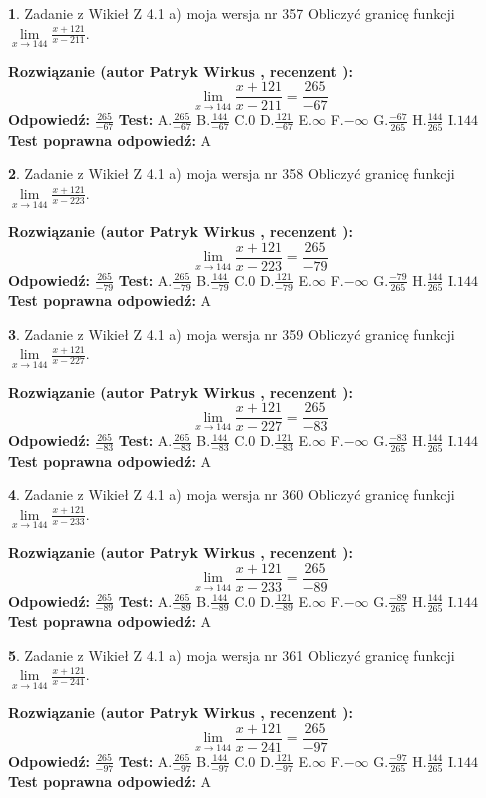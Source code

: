 \documentclass[12pt, a4paper]{article}
\theoremstyle{definition} %
\newtheorem{zad}{}
\newcommand{\zadStart}[1]{\begin{zad}#1\newline}
\newcommand{\zadStop}{\end{zad}}
\newcommand{\rozwStart}[2]{\noindent \textbf{Rozwiązanie (autor #1 , recenzent #2): }\newline}
\newcommand{\rozwStop}{\newline}
\newcommand{\odpStart}{\noindent \textbf{Odpowiedź:}\newline}
\newcommand{\odpStop}{\newline}
\newcommand{\testStart}{\noindent \textbf{Test:}\newline}
\newcommand{\testStop}{\newline}
\newcommand{\kluczStart}{\noindent \textbf{Test poprawna odpowiedź:}\newline}
\newcommand{\kluczStop}{\newline}
\begin{document}
\zadStart{Zadanie z Wikieł Z 4.1 a) moja wersja nr 357}
Obliczyć granicę funkcji $\lim\limits_{x\to144}\frac{x+121}{x-211}$.
\zadStop
\rozwStart{Patryk Wirkus}{}
$$\lim\limits_{x\to144}\frac{x+121}{x-211} = \frac{265}{-67}$$
\rozwStop
\odpStart
$\frac{265}{-67}$
\odpStop
\testStart
A.$\frac{265}{-67}$
B.$\frac{144}{-67}$
C.$0$
D.$\frac{121}{-67}$
E.$\infty$
F.$-\infty$
G.$\frac{-67}{265}$
H.$\frac{144}{265}$
I.$144$
\testStop
\kluczStart
A
\kluczStop



\zadStart{Zadanie z Wikieł Z 4.1 a) moja wersja nr 358}
Obliczyć granicę funkcji $\lim\limits_{x\to144}\frac{x+121}{x-223}$.
\zadStop
\rozwStart{Patryk Wirkus}{}
$$\lim\limits_{x\to144}\frac{x+121}{x-223} = \frac{265}{-79}$$
\rozwStop
\odpStart
$\frac{265}{-79}$
\odpStop
\testStart
A.$\frac{265}{-79}$
B.$\frac{144}{-79}$
C.$0$
D.$\frac{121}{-79}$
E.$\infty$
F.$-\infty$
G.$\frac{-79}{265}$
H.$\frac{144}{265}$
I.$144$
\testStop
\kluczStart
A
\kluczStop



\zadStart{Zadanie z Wikieł Z 4.1 a) moja wersja nr 359}
Obliczyć granicę funkcji $\lim\limits_{x\to144}\frac{x+121}{x-227}$.
\zadStop
\rozwStart{Patryk Wirkus}{}
$$\lim\limits_{x\to144}\frac{x+121}{x-227} = \frac{265}{-83}$$
\rozwStop
\odpStart
$\frac{265}{-83}$
\odpStop
\testStart
A.$\frac{265}{-83}$
B.$\frac{144}{-83}$
C.$0$
D.$\frac{121}{-83}$
E.$\infty$
F.$-\infty$
G.$\frac{-83}{265}$
H.$\frac{144}{265}$
I.$144$
\testStop
\kluczStart
A
\kluczStop



\zadStart{Zadanie z Wikieł Z 4.1 a) moja wersja nr 360}
Obliczyć granicę funkcji $\lim\limits_{x\to144}\frac{x+121}{x-233}$.
\zadStop
\rozwStart{Patryk Wirkus}{}
$$\lim\limits_{x\to144}\frac{x+121}{x-233} = \frac{265}{-89}$$
\rozwStop
\odpStart
$\frac{265}{-89}$
\odpStop
\testStart
A.$\frac{265}{-89}$
B.$\frac{144}{-89}$
C.$0$
D.$\frac{121}{-89}$
E.$\infty$
F.$-\infty$
G.$\frac{-89}{265}$
H.$\frac{144}{265}$
I.$144$
\testStop
\kluczStart
A
\kluczStop



\zadStart{Zadanie z Wikieł Z 4.1 a) moja wersja nr 361}
Obliczyć granicę funkcji $\lim\limits_{x\to144}\frac{x+121}{x-241}$.
\zadStop
\rozwStart{Patryk Wirkus}{}
$$\lim\limits_{x\to144}\frac{x+121}{x-241} = \frac{265}{-97}$$
\rozwStop
\odpStart
$\frac{265}{-97}$
\odpStop
\testStart
A.$\frac{265}{-97}$
B.$\frac{144}{-97}$
C.$0$
D.$\frac{121}{-97}$
E.$\infty$
F.$-\infty$
G.$\frac{-97}{265}$
H.$\frac{144}{265}$
I.$144$
\testStop
\kluczStart
A
\kluczStop
\end{document}
